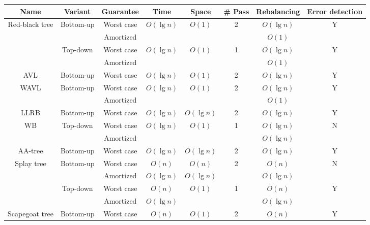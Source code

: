 \begin{table}[!t]
\begin{threeparttable}
\begin{tabular}{cccccccc}
 Name & Variant & Guarantee & Time & Space & \# Pass & Rebalancing & Error detection  \\
 \hline
 \multirow{4}{*}{Red-black tree} & \multirow{2}{*}{Bottom-up} & Worst case & \multirow{2}{*}{$O(\lg n)$} & \multirow{2}{*}{$O(1)$} & \multirow{2}{*}{2} & $O(\lg n)$\tnote{1} & \multirow{2}{*}{Y} \\
  & & Amortized & &  &  & $O(1)$ &  \\
  \cline{2-8}
  & \multirow{2}{*}{Top-down} & Worst case & \multirow{2}{*}{$O(\lg n)$} & \multirow{2}{*}{$O(1)$} & \multirow{2}{*}{1} & $O(\lg n)$ & \multirow{2}{*}{Y} \\
  & & Amortized & & &  & $O(1)$\tnote{2} & \\
  \hline
  AVL & Bottom-up & Worst case & $O(\lg n)$ & $O(1)$ & 2 & $O(\lg n)$\tnote{3} & Y \\
  \hline
  \multirow{2}{*}{WAVL} & \multirow{2}{*}{Bottom-up} & Worst case & \multirow{2}{*}{$O(\lg n)$} & \multirow{2}{*}{$O(1)$} & \multirow{2}{*}{2} & $O(\lg n)$\tnote{4} & \multirow{2}{*}{Y} \\
  & & Amortized & & & & $O(1)$ & \\
  \hline
  LLRB & Bottom-up & Worst case & $O(\lg n)$ & $O(\lg n)$ & 2 & $O(\lg n)$ & Y \\
  \hline
  \multirow{2}{*}{WB} & \multirow{2}{*}{Top-down} & Worst case & \multirow{2}{*}{$O(\lg n)$} & \multirow{2}{*}{$O(1)$} & \multirow{2}{*}{1} & $O(\lg n)$ & \multirow{2}{*}{N\tnote{5}} \\
  & & Amortized &  & & & $O(\lg n)$\tnote{6} &  \\
  \hline
  AA-tree & Bottom-up & Worst case & $O(\lg n)$ & $O(\lg n)$ & 2 & $O(\lg n)$ & Y \\
  \hline
  \multirow{4}{*}{Splay tree} & \multirow{2}{*}{Bottom-up} & Worst case & $O(n)$ & $O(n)$ & \multirow{2}{*}{2} & $O(n)$ & \multirow{2}{*}{N} \\
  & & Amortized & $O(\lg n)$ & $O(\lg n)$ & & $O(\lg n)$ & \\
   & \multirow{2}{*}{Top-down} & Worst case & $O(n)$ & \multirow{2}{*}{$O(1)$} & \multirow{2}{*}{1} & $O(n)$ & \multirow{2}{*}{Y} \\
  & & Amortized & $O(\lg n)$ &  & & $O(\lg n)$ & \\
  \hline
  \multirow{2}{*}{Scapegoat tree} & \multirow{2}{*}{Bottom-up} & Worst case & $O(n)$ & \multirow{2}{*}{$O(1)$\tnote{7}} & \multirow{2}{*}{2} & $O(n)$ & \multirow{2}{*}{Y} \\

\end{tabular}
\end{threeparttable}
\end{table}
